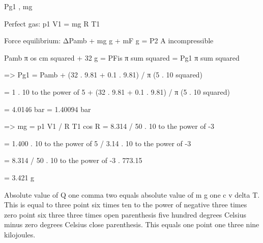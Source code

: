 Pg1 , mg

Perfect gas: p1 V1 = mg R T1

Force equilibrium: ΔPamb + mg g + mF g = P2 A incompressible

Pamb π os cm squared + 32 g = PFis π sum squared = Pg1 π sum squared

=> Pg1 = Pamb + (32 . 9.81 + 0.1 . 9.81) / π (5 . 10 squared)

= 1 . 10 to the power of 5 + (32 . 9.81 + 0.1 . 9.81) / π (5 . 10 squared)

= 4.0146 bar = 1.40094 bar

=> mg = p1 V1 / R T1 cos R = 8.314 / 50 . 10 to the power of -3

= 1.400 . 10 to the power of 5 / 3.14 . 10 to the power of -3

= 8.314 / 50 . 10 to the power of -3 . 773.15

= 3.421 g

Absolute value of Q one comma two equals absolute value of m g one c v delta T. This is equal to three point six times ten to the power of negative three times zero point six three three times open parenthesis five hundred degrees Celsius minus zero degrees Celsius close parenthesis. This equals one point one three nine kilojoules.